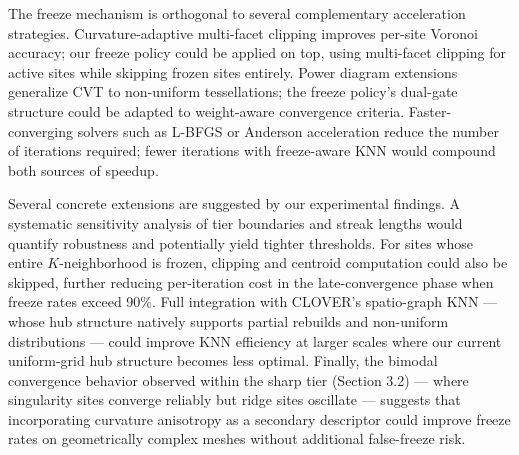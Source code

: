 The freeze mechanism is orthogonal to several complementary acceleration strategies. Curvature-adaptive multi-facet clipping \cite{fei2025adaptive} improves per-site Voronoi accuracy; our freeze policy could be applied on top, using multi-facet clipping for active sites while skipping frozen sites entirely. Power diagram extensions \cite{degoes2012blue} generalize CVT to non-uniform tessellations; the freeze policy's dual-gate structure could be adapted to weight-aware convergence criteria. Faster-converging solvers such as L-BFGS or Anderson acceleration reduce the number of iterations required; fewer iterations with freeze-aware KNN would compound both sources of speedup.

Several concrete extensions are suggested by our experimental findings. A systematic sensitivity analysis of tier boundaries and streak lengths would quantify robustness and potentially yield tighter thresholds. For sites whose entire $K$-neighborhood is frozen, clipping and centroid computation could also be skipped, further reducing per-iteration cost in the late-convergence phase when freeze rates exceed 90\%. Full integration with CLOVER's spatio-graph KNN \cite{kamel2025clover} --- whose hub structure natively supports partial rebuilds and non-uniform distributions --- could improve KNN efficiency at larger scales where our current uniform-grid hub structure becomes less optimal. Finally, the bimodal convergence behavior observed within the sharp tier (Section 3.2) --- where singularity sites converge reliably but ridge sites oscillate --- suggests that incorporating curvature anisotropy as a secondary descriptor could improve freeze rates on geometrically complex meshes without additional false-freeze risk.
